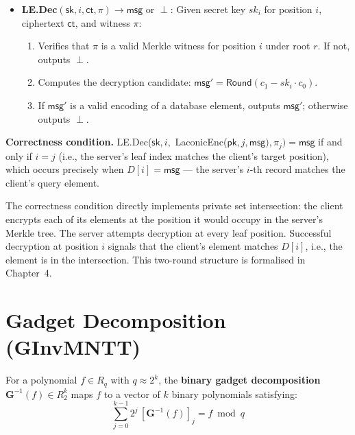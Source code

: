 \begin{definition}
\begin{itemize}
    \item \textsf{\textbf{LE.Dec}}$(\mathsf{sk}, i, \mathsf{ct}, \pi) \to \mathsf{msg}$ or $\perp$: Given
          secret key $sk_i$ for position $i$, ciphertext $\mathsf{ct}$, and witness $\pi$:
          \begin{enumerate}
              \item Verifies that $\pi$ is a valid Merkle witness for position $i$ under root $r$. If not, outputs $\perp$.
              \item Computes the decryption candidate: $\mathsf{msg}' = \textsf{Round}(c_1 - sk_i \cdot c_0)$.
              \item If $\mathsf{msg}'$ is a valid encoding of a database element, outputs $\mathsf{msg}'$; otherwise outputs $\perp$.
          \end{enumerate}
\end{itemize}
\end{definition}

\textbf{Correctness condition.} \textsf{LE.Dec}($\mathsf{sk}, i,$ \textsf{LaconicEnc}($\mathsf{pk}, j, \mathsf{msg}), \pi_j) = \mathsf{msg}$ if and only if $i = j$ (i.e., the server's leaf index matches the client's target position), which occurs precisely when $D[i] = \mathsf{msg}$ --- the server's $i$-th record matches the client's query element.

\begin{remark}
The correctness condition directly implements private set intersection: the client encrypts each of its elements at the position it would occupy in the server's Merkle tree. The server attempts decryption at every leaf position. Successful decryption at position $i$ signals that the client's element matches $D[i]$, i.e., the element is in the intersection. This two-round structure is formalised in Chapter~4.
\end{remark}

\section{Gadget Decomposition (GInvMNTT)}

\begin{definition}\label{def:gadget}
For a polynomial $f \in R_q$ with $q \approx 2^k$, the \textbf{binary gadget
decomposition} $\mathbf{G}^{-1}(f) \in R_2^k$ maps $f$ to a vector of $k$
binary polynomials satisfying:
\[
\sum_{j=0}^{k-1} 2^j \, [\mathbf{G}^{-1}(f)]_j = f \bmod q
\]
\end{definition}

